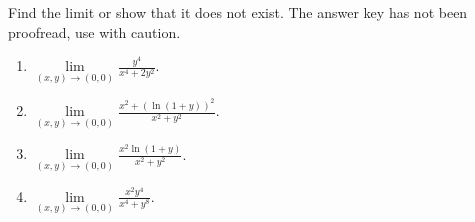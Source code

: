 Find the limit or show that it does not exist. The answer key has not been proofread, use with caution.

\begin{enumerate}[ref={\fcProblemRef}]
\item  \label{problem-lim-xytozero-(y^4)/(x^4+2y^2)} $\displaystyle \lim\limits_{(x,y)\to (0,0)}\frac{ y^4}{x^4+2y^2}$.


\item $\displaystyle \lim\limits_{(x,y)\to (0,0)} \frac{x^2+\left(\ln (1+y)\right)^2}{x^2+y^2}$.


\item $\displaystyle \lim\limits_{(x,y)\to (0,0)} \frac{x^2\ln (1+y)}{x^2+y^2}$.


\item $\displaystyle \lim\limits_{(x,y)\to (0,0)} \frac{x^2y^4}{x^4+y^8} .$


\end{enumerate}